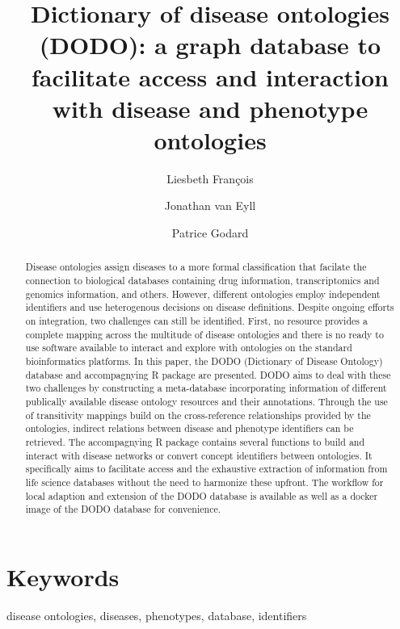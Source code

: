 \documentclass[9pt,a4paper,]{extarticle}
\begin{document}
\pagestyle{front}

\title{Dictionary of disease ontologies (DODO): a graph database to facilitate access and interaction with disease and phenotype ontologies}

\author[1]{Liesbeth François}
\author[2]{Jonathan van Eyll}
\author[2]{Patrice Godard}

\maketitle
\thispagestyle{front}

\begin{abstract}
Disease ontologies assign diseases to a more formal classification that facilate the connection to biological databases containing drug information, transcriptomics and genomics information, and others. However, different ontologies employ independent identifiers and use heterogenous decisions on disease definitions. Despite ongoing efforts on integration, two challenges can still be identified. First, no resource provides a complete mapping across the multitude of disease ontologies and there is no ready to use software available to interact and explore with ontologies on the standard bioinformatics platforms. In this paper, the DODO (Dictionary of Disease Ontology) database and accompagnying R package are presented. DODO aims to deal with these two challenges by constructing a meta-database incorporating information of different publically available disease ontology resources and their annotations. Through the use of transitivity mappings build on the cross-reference relationships provided by the ontologies, indirect relations between disease and phenotype identifiers can be retrieved. The accompagnying R package contains several functions to build and interact with disease networks or convert concept identifiers between ontologies. It specifically aims to facilitate access and the exhaustive extraction of information from life science databases without the need to harmonize these upfront. The workflow for local adaption and extension of the DODO database is available as well as a docker image of the DODO database for convenience.
\end{abstract}

\section*{Keywords}
disease ontologies, diseases, phenotypes, database, identifiers
\end{document}
